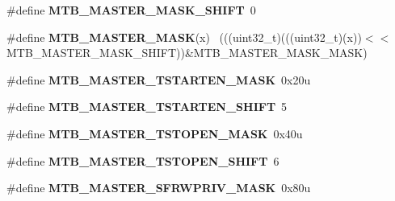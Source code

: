 \begin{DoxyCompactItemize}
\item 
\hypertarget{group___m_t_b___register___masks_gad437c892ab8b61d2ffb4cd86dd2aa9b5}{}\#define {\bfseries M\+T\+B\+\_\+\+M\+A\+S\+T\+E\+R\+\_\+\+M\+A\+S\+K\+\_\+\+S\+H\+I\+F\+T}~0\label{group___m_t_b___register___masks_gad437c892ab8b61d2ffb4cd86dd2aa9b5}

\item 
\hypertarget{group___m_t_b___register___masks_gaf67b0520a4f0ddadfd1268611b3e919c}{}\#define {\bfseries M\+T\+B\+\_\+\+M\+A\+S\+T\+E\+R\+\_\+\+M\+A\+S\+K}(x)                                          ~(((uint32\+\_\+t)(((uint32\+\_\+t)(x))$<$$<$M\+T\+B\+\_\+\+M\+A\+S\+T\+E\+R\+\_\+\+M\+A\+S\+K\+\_\+\+S\+H\+I\+F\+T))\&M\+T\+B\+\_\+\+M\+A\+S\+T\+E\+R\+\_\+\+M\+A\+S\+K\+\_\+\+M\+A\+S\+K)\label{group___m_t_b___register___masks_gaf67b0520a4f0ddadfd1268611b3e919c}

\item 
\hypertarget{group___m_t_b___register___masks_gace5fa3a07ba94b52b019ba4adf6ded1d}{}\#define {\bfseries M\+T\+B\+\_\+\+M\+A\+S\+T\+E\+R\+\_\+\+T\+S\+T\+A\+R\+T\+E\+N\+\_\+\+M\+A\+S\+K}~0x20u\label{group___m_t_b___register___masks_gace5fa3a07ba94b52b019ba4adf6ded1d}

\item 
\hypertarget{group___m_t_b___register___masks_ga7ffc111a955bf51244819ab23048d2e9}{}\#define {\bfseries M\+T\+B\+\_\+\+M\+A\+S\+T\+E\+R\+\_\+\+T\+S\+T\+A\+R\+T\+E\+N\+\_\+\+S\+H\+I\+F\+T}~5\label{group___m_t_b___register___masks_ga7ffc111a955bf51244819ab23048d2e9}

\item 
\hypertarget{group___m_t_b___register___masks_ga6497971415da774904dac543bebf23bb}{}\#define {\bfseries M\+T\+B\+\_\+\+M\+A\+S\+T\+E\+R\+\_\+\+T\+S\+T\+O\+P\+E\+N\+\_\+\+M\+A\+S\+K}~0x40u\label{group___m_t_b___register___masks_ga6497971415da774904dac543bebf23bb}

\item 
\hypertarget{group___m_t_b___register___masks_ga3b7209aa39e65d10758a0ea962d32e8a}{}\#define {\bfseries M\+T\+B\+\_\+\+M\+A\+S\+T\+E\+R\+\_\+\+T\+S\+T\+O\+P\+E\+N\+\_\+\+S\+H\+I\+F\+T}~6\label{group___m_t_b___register___masks_ga3b7209aa39e65d10758a0ea962d32e8a}

\item 
\hypertarget{group___m_t_b___register___masks_ga445e1c53e9424d2e2c730fcd390009d7}{}\#define {\bfseries M\+T\+B\+\_\+\+M\+A\+S\+T\+E\+R\+\_\+\+S\+F\+R\+W\+P\+R\+I\+V\+\_\+\+M\+A\+S\+K}~0x80u\label{group___m_t_b___register___masks_ga445e1c53e9424d2e2c730fcd390009d7}


\end{DoxyCompactItemize}
